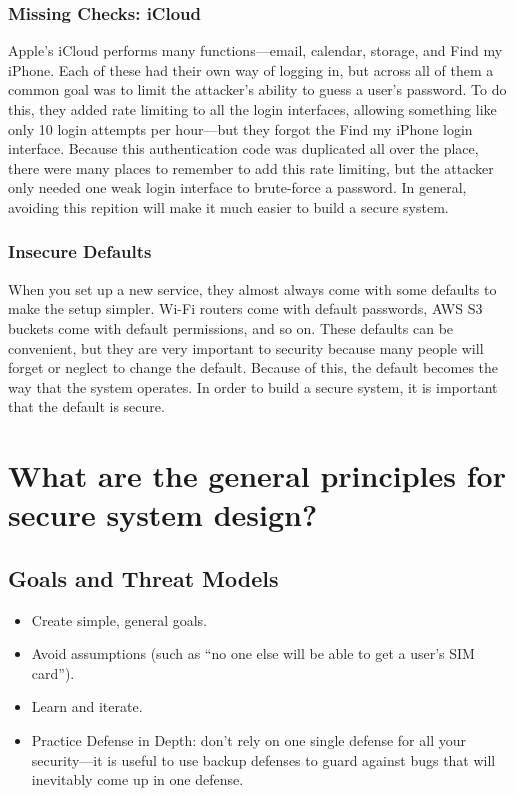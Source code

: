 \subsubsection{Missing Checks: iCloud}
Apple's iCloud performs many functions---email, calendar, storage, and Find my iPhone. Each of these had their own way of logging in, but across all of them a common goal was to limit the attacker's ability to guess a user's password. To do this, they added rate limiting to all the login interfaces, allowing something like only 10 login attempts per hour---but they forgot the Find my iPhone login interface. Because this authentication code was duplicated all over the place, there were many places to remember to add this rate limiting, but the attacker only needed one weak login interface to brute-force a password. In general, avoiding this repition will make it much easier to build a secure system.

\subsubsection{Insecure Defaults}
When you set up a new service, they almost always come with some defaults to make the setup simpler. Wi-Fi routers come with default passwords, AWS S3 buckets come with default permissions, and so on. These defaults can be convenient, but they are very important to security because many people will forget or neglect to change the default. Because of this, the default becomes the way that the system operates. In order to build a secure system, it is important that the default is secure.

\section{What are the general principles for secure system design?}
\subsection{Goals and Threat Models}
\begin{itemize}
	\item Create simple, general goals.
	\item Avoid assumptions (such as ``no one else will be able to get a user's SIM card'').
	\item Learn and iterate.
	\item Practice Defense in Depth: don't rely on one single defense for all your security---it is useful to use backup defenses to guard against bugs that will inevitably come up in one defense.
\end{itemize}

